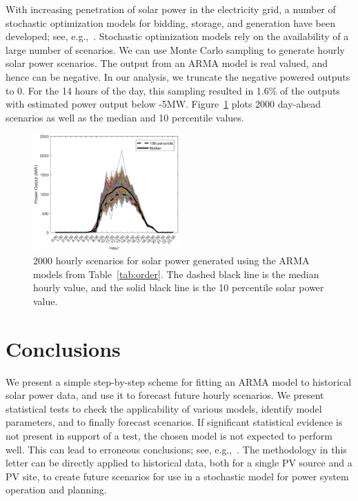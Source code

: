 \documentclass[letter]{IEEEtran}
\begin{document}
With increasing penetration of solar power in the electricity grid, a number of 
stochastic optimization models for bidding, storage, and generation have been 
developed; see, e.g.,~\cite{banos2011optimization,sharma2012stochastic}. 
Stochastic optimization models rely on the availability of a large number of 
scenarios.  We can use Monte Carlo sampling to generate hourly solar power 
scenarios. The output from an ARMA model is real valued, and hence can be 
negative. In our analysis, we truncate the negative powered outputs to 0. For 
the 14 hours of 
the day, this sampling resulted in 1.6\% of the outputs with estimated power 
output below -5MW. Figure~\ref{fig:sample} plots 2000 day-ahead scenarios 
as well as the median and 10 percentile values. 


\begin{figure}[!t]
\centering
\includegraphics[width=0.5\textwidth]{sample_smooth.eps}
\caption{2000 hourly scenarios for solar power generated using the ARMA models 
from Table~\ref{tab:order}. The dashed black line is the median hourly value, 
and the solid black line is
the 10 percentile solar power value.}
 \label{fig:sample}
\end{figure}

\section{Conclusions}
We present a simple step-by-step scheme for fitting an ARMA model to 
historical solar power data, and use it to forecast future hourly scenarios. 
We present statistical tests to check the applicability of various models, 
identify model parameters, and to finally forecast scenarios. If significant 
statistical evidence is not present in support of a 
test, the chosen model is not expected to perform well. This can lead to 
erroneous conclusions; see, 
e.g.,~\cite{kwiatkowski1992testing,phillips1988testing}.
The methodology in this letter can be directly applied to historical data, 
both for a single PV source and a PV site,
to create future scenarios for use in a stochastic model for power system 
operation and planning.
\end{document}
